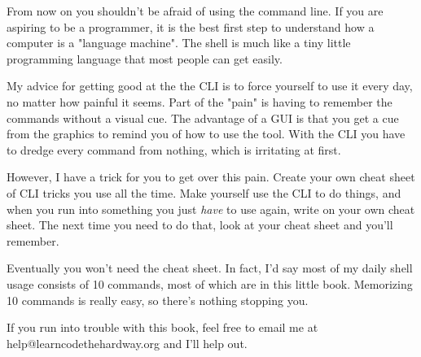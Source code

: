From now on you shouldn't be afraid of using the command line.  If you are
aspiring to be a programmer, it is the best first step to understand how
a computer is a "language machine".  The shell is much like a tiny little
programming language that most people can get easily.

My advice for getting good at the the CLI is to force yourself to use it every
day, no matter how painful it seems.  Part of the "pain" is having to remember
the commands without a visual cue.  The advantage of a GUI is that you get a
cue from the graphics to remind you of how to use the tool.  With the CLI you
have to dredge every command from nothing, which is irritating at first.

However, I have a trick for you to get over this pain.  Create your own cheat
sheet of CLI tricks you use all the time.  Make yourself use the CLI to do
things, and when you run into something you just \emph{have} to use again, 
write on your own cheat sheet.  The next time you need to do that, look at
your cheat sheet and you'll remember.

Eventually you won't need the cheat sheet.  In fact, I'd say most of my
daily shell usage consists of 10 commands, most of which are in this little
book.  Memorizing 10 commands is really easy, so there's nothing stopping you.

If you run into trouble with this book, feel free to email me at 
help@learncodethehardway.org and I'll help out.
